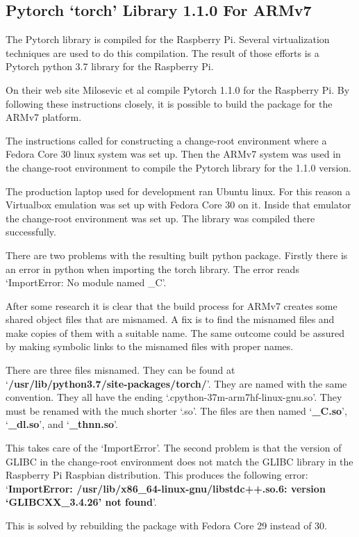 \subsection{Pytorch `torch' Library 1.1.0 For ARMv7}
The Pytorch library is compiled for the Raspberry Pi. Several virtualization techniques are used to do this compilation. The result of those efforts is a Pytorch python 3.7 library for the Raspberry Pi.

On their web site Milosevic et al \cite{2018Milosevic} compile Pytorch 1.1.0 for the Raspberry Pi. By following these instructions closely, it is possible to build the package for the ARMv7 platform.

The instructions called for constructing a change-root environment where a Fedora Core 30 linux system was set up. Then the ARMv7 system was used in the change-root environment to compile the Pytorch library for the 1.1.0 version.

The production laptop used for development ran Ubuntu linux. For this reason a Virtualbox emulation was set up with Fedora Core 30 on it. Inside that emulator the change-root environment was set up. The library was compiled there successfully. 

There are two problems with the resulting built python package. Firstly there is an error in python when importing the torch library. The error reads `ImportError: No module named \_C'. 

After some research it is clear that the build process for ARMv7 creates some shared object files that are misnamed. A fix is to find the misnamed files and make copies of them with a suitable name. The same outcome could be assured by making symbolic links to the misnamed files with proper names.

There are three files misnamed. They can be found at `\textbf{/usr/lib/python3.7/site-packages/torch/}'. They are named with the same convention. They all have the ending `.cpython-37m-arm7hf-linux-gnu.so'. They must be renamed with the much shorter `.so'. The files are then named `\textbf{\_C.so}', `\textbf{\_dl.so}', and `\textbf{\_thnn.so}'.

This takes care of the `ImportError'. The second problem is that the version of GLIBC in the change-root environment does not match the GLIBC library in the Raspberry Pi Raspbian distribution. This produces the following error: `\textbf{ImportError: /usr/lib/x86\_64-linux-gnu/libstdc++.so.6: version `GLIBCXX\_3.4.26' not found}'.

This is solved by rebuilding the package with Fedora Core 29 instead of 30. 
 
